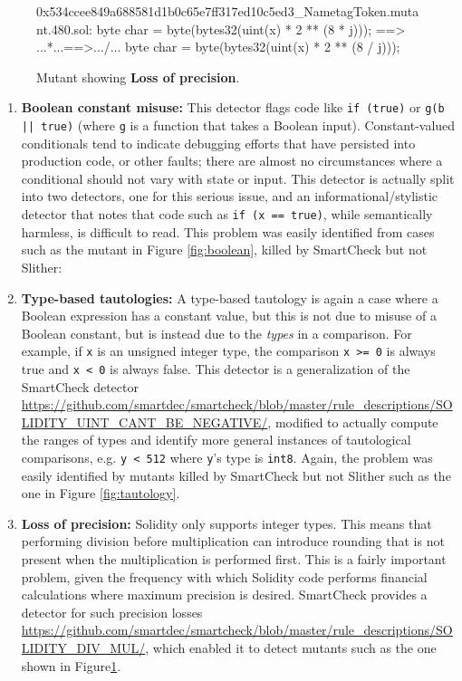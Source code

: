 \begin{figure}
  {\scriptsize
\begin{code}
 0x534ccee849a688581d1b0c65e7ff317ed10c5ed3\_NametagToken.mutant.480.sol:
 byte char = byte(bytes32(uint(x) * 2 ** (8 * j)));
 ==>  ...*...==>.../...
 byte char = byte(bytes32(uint(x) * 2 ** (8 / j)));
      \end{code}
      }
      \caption{Mutant showing {\bf Loss of precision}.}
      \label{fig:divmul}            
      \end{figure}

\begin{enumerate}
\item {\bf Boolean constant misuse:}  This detector flags code like {\tt if (true)} or {\tt g(b || true)} (where {\tt g} is a function that takes a Boolean input).  Constant-valued conditionals tend to indicate debugging efforts that have persisted into production code, or other faults; there are almost no circumstances where a conditional should not vary with state or input.  This detector is actually split into two detectors, one for this serious issue, and an informational/stylistic detector that notes that code such as {\tt if (x == true)}, while semantically harmless, is difficult to read.  This problem was easily identified from cases such as the mutant in Figure \ref{fig:boolean}, killed by SmartCheck but not Slither:

\item {\bf Type-based tautologies:}  A type-based tautology is again a case where a Boolean expression has a constant value, but this is not due to misuse of a Boolean constant, but is instead due to the \emph{types} in a comparison.  For example, if {\tt x} is an unsigned integer type, the comparison {\tt x >= 0} is always true and {\tt x < 0} is always false.  This detector is a generalization of the SmartCheck detector \url{https://github.com/smartdec/smartcheck/blob/master/rule\_descriptions/SOLIDITY\_UINT\_CANT\_BE\_NEGATIVE/}, modified to actually compute the ranges of types and identify more general instances of tautological comparisons, e.g. {\tt y < 512} where {\tt y}'s type is {\tt int8}.  Again, the problem was easily identified by mutants killed by SmartCheck but not Slither such as the one in Figure \ref{fig:tautology}.

\item {\bf Loss of precision:}  Solidity only supports integer types.  This means that performing division before multiplication can introduce rounding that is not present when the multiplication is performed first.  This is a fairly important problem, given the frequency with which Solidity code performs financial calculations where maximum precision is desired.  SmartCheck provides a detector for such precision losses \url{https://github.com/smartdec/smartcheck/blob/master/rule\_descriptions/SOLIDITY\_DIV\_MUL/}, which enabled it to detect mutants such as the one shown in Figure\ref{fig:divmul}.
\end{enumerate}      


